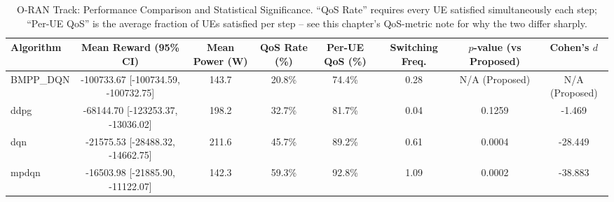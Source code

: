 \begin{table}[h]
\centering
\caption{O-RAN Track: Performance Comparison and Statistical Significance. ``QoS Rate'' requires every UE satisfied simultaneously each step; ``Per-UE QoS'' is the average fraction of UEs satisfied per step -- see this chapter's QoS-metric note for why the two differ sharply.}
\begin{tabular}{lccccccc}
\hline
Algorithm & Mean Reward (95\% CI) & Mean Power (W) & QoS Rate (\%) & Per-UE QoS (\%) & Switching Freq. & $p$-value (vs Proposed) & Cohen's $d$ \\
\hline
BMPP_DQN & -100733.67 [-100734.59, -100732.75] & 143.7 & 20.8\% & 74.4\% & 0.28 & N/A (Proposed) & N/A (Proposed) \\
ddpg & -68144.70 [-123253.37, -13036.02] & 198.2 & 32.7\% & 81.7\% & 0.04 & 0.1259 & -1.469 \\
dqn & -21575.53 [-28488.32, -14662.75] & 211.6 & 45.7\% & 89.2\% & 0.61 & 0.0004 & -28.449 \\
mpdqn & -16503.98 [-21885.90, -11122.07] & 142.3 & 59.3\% & 92.8\% & 1.09 & 0.0002 & -38.883 \\
\hline
\end{tabular}
\end{table}
